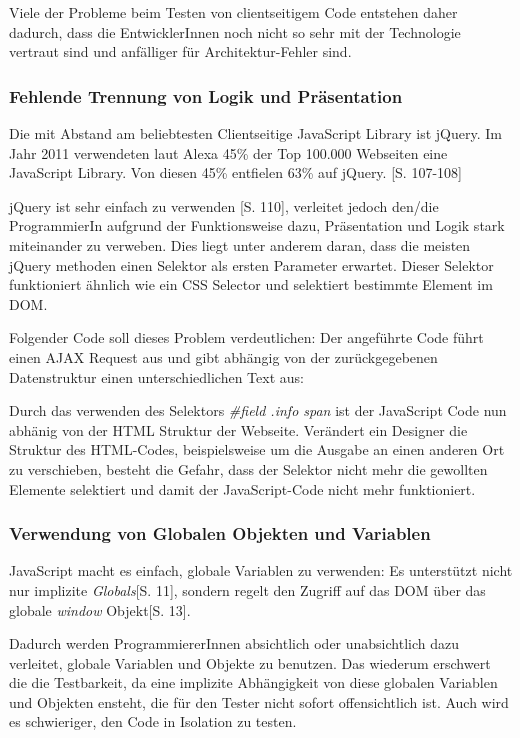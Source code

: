 \documentclass[a4paper,bibtotoc,oneside]{scrbook}
\begin{document}
Viele der Probleme beim Testen von clientseitigem Code entstehen daher dadurch, dass die EntwicklerInnen noch nicht so sehr mit der Technologie vertraut sind und anfälliger für Architektur-Fehler sind.

\subsubsection{Fehlende Trennung von Logik und Präsentation}
Die mit Abstand am beliebtesten Clientseitige JavaScript Library ist jQuery. Im Jahr 2011 verwendeten laut Alexa 45\% der Top 100.000 Webseiten eine JavaScript Library. Von diesen 45\% entfielen 63\% auf jQuery. \cite{jquery}[S. 107-108]

jQuery ist sehr einfach zu verwenden \cite{jquery}[S. 110], verleitet jedoch den/die ProgrammierIn aufgrund der Funktionsweise dazu, Präsentation und Logik stark miteinander zu verweben. Dies liegt unter anderem daran, dass die meisten jQuery methoden einen Selektor als ersten Parameter erwartet. Dieser Selektor funktioniert ähnlich wie ein CSS Selector und selektiert bestimmte Element im DOM. \cite{jquery_selectors}

Folgender Code soll dieses Problem verdeutlichen: Der angeführte Code führt einen AJAX Request aus und gibt abhängig von der zurückgegebenen Datenstruktur einen unterschiedlichen Text aus:




Durch das verwenden des Selektors \emph{\#field .info span} ist der JavaScript Code nun abhänig von der HTML Struktur der Webseite. Verändert ein Designer  die Struktur des HTML-Codes, beispielsweise um die Ausgabe an einen anderen Ort zu verschieben, besteht die Gefahr, dass der Selektor nicht mehr die gewollten Elemente selektiert und damit der JavaScript-Code nicht mehr funktioniert.

\subsubsection{Verwendung von Globalen Objekten und Variablen}
JavaScript macht es einfach, globale Variablen zu verwenden: Es unterstützt nicht nur implizite \emph{Globals}\cite{js_patterns}[S. 11], sondern regelt den Zugriff auf das DOM über das globale \emph{window} Objekt\cite{js_patterns}[S. 13].

Dadurch werden ProgrammiererInnen absichtlich oder unabsichtlich dazu verleitet, globale Variablen und Objekte zu benutzen. Das wiederum erschwert die die Testbarkeit, da eine implizite Abhängigkeit von diese globalen Variablen und Objekten ensteht, die für den Tester nicht sofort offensichtlich ist. Auch wird es schwieriger, den Code in Isolation zu testen.
\end{document}
